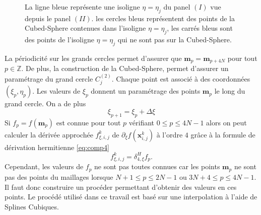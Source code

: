 \begin{figure}[htbp]
\begin{center}
\end{center}
\caption{La ligne bleue représente une isoligne $\eta=\eta_j$ du panel $(I)$ vue depuis le panel $(II)$. les cercles bleus représentent des points de la Cubed-Sphere contenues dans l'isoligne $\eta=\eta_j$, les carrés bleus sont des points de l'isoligne $\eta=\eta_j$ qui ne sont pas sur la Cubed-Sphere.}
\label{fig: panel II_interp}
\end{figure}  

La périodicité sur les grands cercles permet d'assurer que $\mathbf{m}_p = \mathbf{m}_{p+4N}$ pour tout $p \in \mathbb{Z}$. De plus, la construction de la Cubed-Sphere, permet d'assurer un paramétrage du grand cercle $C^{(2)}_j$. Chaque point est associé à des coordonnées $(\xi_p, \eta_p)$. Les valeurs de $\xi_p$ donnent un paramétrage des points $\mathbf{m}_p$ le long du grand cercle. On a de plus
\begin{equation}
\xi_{p+1} = \xi_p + \Delta \xi
\end{equation}
Si $f_p = f(\mathbf{m}_p)$ est connue pour tout $p$ vérifiant $0 \leq p \leq 4N-1$ alors on peut calculer la dérivée approchée $f_{\xi,i,j}^k$ de $\partial_{\xi}f(\mathbf{x}_{i,j}^k)$ à l'ordre $4$ grâce à la formule de dérivation hermitienne \eqref{eq:comp4}
\begin{equation}
f_{\xi,i,j}^k = \delta_{4,\xi}^H f_p.
\end{equation}
Cependant, les valeurs de $f_p$ ne sont pas toutes connues car les points $\mathbf{m}_p$ ne sont pas des points du maillages lorsque $N+1 \leq p \leq 2N-1$ ou $3N+4 \leq p \leq 4N-1$. Il faut donc construire un procéder permettant d'obtenir des valeurs en ces points. Le procédé utilisé dans ce travail est basé sur une interpolation à l'aide de Splines Cubiques.

